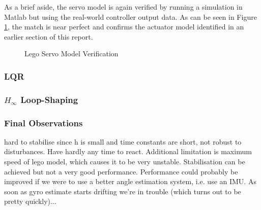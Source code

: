 As a brief aside, the servo model is again verified by running a simulation in Matlab but using the real-world controller output data. As can be seen in Figure \ref{fig:LegoServoIDPart2}, the match is near perfect and confirms the actuator model identified in an earlier section of this report. \\

\begin{figure}[H]
\centering
{}
	\caption{Lego Servo Model Verification}
	\label{fig:LegoServoIDPart2}
\end{figure}

\subsubsection{LQR}

\subsubsection{$H_{\infty}$ Loop-Shaping}

\subsubsection{Final Observations}
hard to stabilise since h is small and time constants are short, not robust to disturbances. Have hardly any time to react. Additional limitation is maximum speed of lego model, which causes it to be very unstable. Stabilisation can be achieved but not a very good performance. Performance could probably be improved if we were to use a better angle estimation system, i.e. use an IMU. As soon as gyro estimate starts drifting we're in trouble (which turns out to be pretty quickly)...